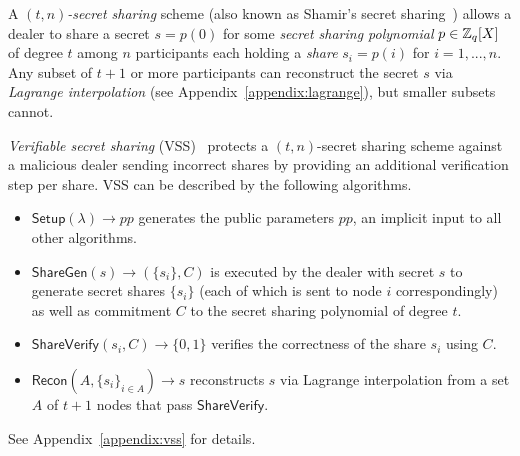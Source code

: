 \begin{definition}
A \textit{$(t, n)$-secret sharing} scheme (also known as Shamir's secret sharing~\cite{shamir1979share}) allows a dealer to share a secret $s = p(0)$ for some \textit{secret sharing polynomial} $p \in \mathbb{Z}_q[X]$ of degree $t$ among $n$ participants each holding a \textit{share} $s_i = p(i)$ for $i = 1, ..., n$. Any subset of $t + 1$ or more participants can reconstruct the secret $s$ via \textit{Lagrange interpolation} (see Appendix~\ref{appendix:lagrange}), but smaller subsets cannot.
\end{definition}

\begin{definition}
\textit{Verifiable secret sharing} (VSS)~\cite{feldman1987practical, pedersen1991non} protects a $(t, n)$-secret sharing scheme against a malicious dealer sending incorrect shares by providing an additional verification step per share. VSS can be described by the following algorithms.
\begin{itemize}
    \item $\mathsf{Setup}(\lambda) \rightarrow pp$ generates the public parameters $pp$, an implicit input to all other algorithms.
    \item $\mathsf{ShareGen}(s) \rightarrow (\{s_i\}, C)$ is executed by the dealer with secret $s$ to generate secret shares $\{s_i\}$ (each of which is sent to node $i$ correspondingly) as well as commitment $C$ to the secret sharing polynomial of degree $t$.
    \item $\mathsf{ShareVerify}(s_i, C) \rightarrow \{0, 1\}$ verifies the correctness of the share $s_i$ using $C$.
    \item $\mathsf{Recon}(A, \{s_i\}_{i \in A}) \rightarrow s$ reconstructs $s$ via Lagrange interpolation from a set $A$ of $t + 1$ nodes that pass $\mathsf{ShareVerify}$.
\end{itemize}
See Appendix~\ref{appendix:vss} for details.
\end{definition}

